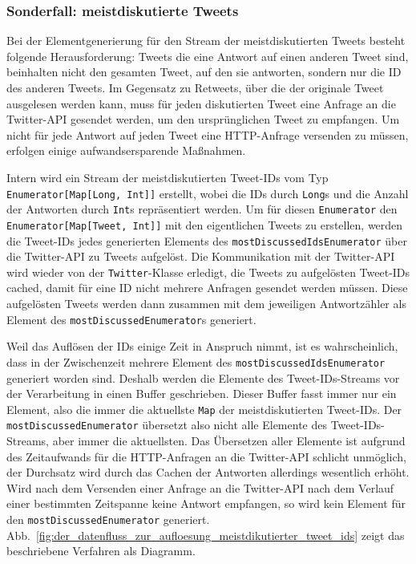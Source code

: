 
\subsubsection{Sonderfall: meistdiskutierte Tweets} %
\label{ssub:sonderfall_meistdiskutierte_tweets}

Bei der Elementgenerierung für den Stream der meistdiskutierten Tweets besteht folgende Herausforderung:
Tweets die eine Antwort auf einen anderen Tweet sind, beinhalten nicht den gesamten Tweet, auf den sie antworten, sondern nur die ID des anderen Tweets.
Im Gegensatz zu Retweets, über die der originale Tweet ausgelesen werden kann, muss für jeden diskutierten Tweet eine Anfrage an die Twitter-API gesendet werden, um den ursprünglichen Tweet zu empfangen.
Um nicht für jede Antwort auf jeden Tweet eine HTTP-Anfrage versenden zu müssen, erfolgen einige aufwandsersparende Maßnahmen.

Intern wird ein Stream der meistdiskutierten Tweet-IDs vom Typ \lstinline|Enumerator[Map[Long, Int]]| erstellt, wobei die IDs durch \lstinline|Long|s und die Anzahl der Antworten durch \lstinline|Int|s repräsentiert werden.
Um für diesen \lstinline|Enumerator| den \lstinline|Enumerator[Map[Tweet, Int]]| mit den eigentlichen Tweets zu erstellen, werden die Tweet-IDs jedes generierten Elements des \lstinline|mostDiscussedIdsEnumerator| über die Twitter-API zu Tweets aufgelöst.
Die Kommunikation mit der Twitter-API wird wieder von der \lstinline|Twitter|-Klasse erledigt, die Tweets zu aufgelösten Tweet-IDs cached, damit für eine ID nicht mehrere Anfragen gesendet werden müssen.
Diese aufgelösten Tweets werden dann zusammen mit dem jeweiligen Antwortzähler als Element des \lstinline|mostDiscussedEnumerator|s generiert.

Weil das Auflösen der IDs einige Zeit in Anspruch nimmt, ist es wahrscheinlich, dass in der Zwischenzeit mehrere Element des \lstinline|mostDiscussedIdsEnumerator| generiert worden sind.
Deshalb werden die Elemente des Tweet-IDs-Streams vor der Verarbeitung in einen Buffer geschrieben.
Dieser Buffer fasst immer nur ein Element, also die immer die aktuellste \lstinline|Map| der meistdiskutierten Tweet-IDs.
Der \lstinline|mostDiscussedEnumerator| übersetzt also nicht alle Elemente des Tweet-IDs-Streams, aber immer die aktuellsten.
Das Übersetzen aller Elemente ist aufgrund des Zeitaufwands für die HTTP-Anfragen an die Twitter-API schlicht unmöglich, der Durchsatz wird durch das Cachen der Antworten allerdings wesentlich erhöht.
Wird nach dem Versenden einer Anfrage an die Twitter-API nach dem Verlauf einer bestimmten Zeitspanne keine Antwort empfangen, so wird kein Element für den \lstinline|mostDiscussedEnumerator| generiert.
Abb.~\ref{fig:der_datenfluss_zur_aufloesung_meistdikutierter_tweet_ids} zeigt das beschriebene Verfahren als Diagramm.


